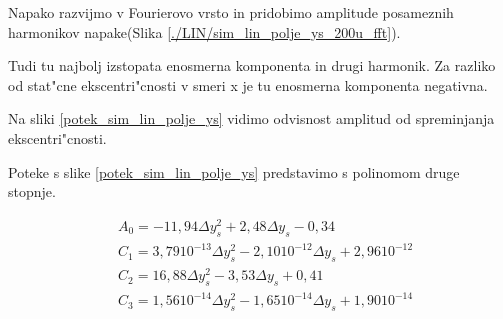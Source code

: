 Napako razvijmo v Fourierovo vrsto in pridobimo amplitude posameznih harmonikov napake(Slika \ref{./LIN/sim_lin_polje_ys_200u_fft}).

Tudi tu najbolj izstopata enosmerna komponenta in drugi harmonik. Za razliko od stat"cne ekscentri"cnosti v smeri x je tu enosmerna komponenta negativna.



Na sliki \ref{potek_sim_lin_polje_ys} vidimo odvisnost amplitud od spreminjanja ekscentri"cnosti.


Poteke s slike \ref{potek_sim_lin_polje_ys} predstavimo s polinomom druge stopnje.

\begin{eqnarray}
&A_0=-11,94 \Delta y_s^2+2,48\Delta y_s- 0,34\\
&C_1=3,79 10^{-13} \Delta y_s^2-2,10 10^{-12} \Delta y_s+ 2,96 10^{-12}\\
&C_2=16,88 \Delta y_s^2-3,53  \Delta y_s+0,41\\
&C_3=1,56 10^{-14} \Delta y_s^2-1,65 10^{-14} \Delta y_s+1,90 10^{-14}
\end{eqnarray}




